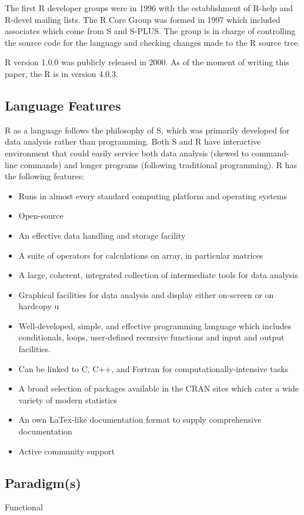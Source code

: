 \documentclass[12pt]{article}
\begin{document}
The first R developer groups were in 1996 with the establishment of R-help and R-devel mailing lists. The R Core Group was formed in 1997 which included associates which come from S and S-PLUS. The group is in charge of controlling the source code for the language and checking changes made to the R source tree.

R version 1.0.0 was publicly released in 2000. As of the moment of writing this paper, the R is in version 4.0.3.
\subsection{Language Features}
R as a language follows the philosophy of S, which was primarily developed for data analysis rather than programming. Both S and R have interactive environment that could easily service both data analysis (skewed to command-line commands) and longer programs (following traditional programming). R has the following features:
\begin{itemize}
\item Runs in almost every standard computing platform  and operating systems
\item Open-source
\item An effective data handling and storage facility
\item A suite of operators for calculations on array, in particular matrices
\item A large, coherent, integrated collection of intermediate tools for data analysis
\item Graphical facilities for data analysis and display either on-screen or on hardcopy u
\item Well-developed, simple, and effective programming language which includes conditionals, loops, user-defined recursive functions and input and output facilities.
\item Can be linked to C, C++, and Fortran for computationally-intensive tasks
\item A broad selection of packages available in the CRAN sites which cater a wide variety of modern statistics
\item An own LaTex-like documentation format to supply comprehensive documentation
\item Active community support
\end{itemize}

\subsection{Paradigm(s)}
Functional
\end{document}
